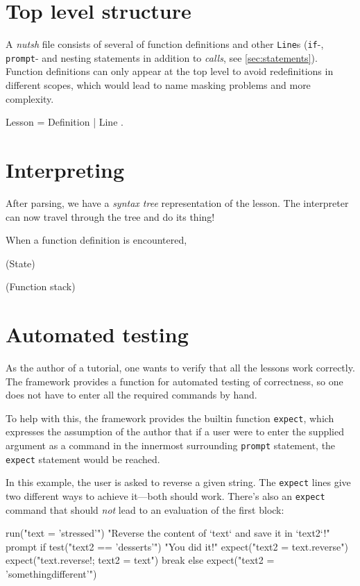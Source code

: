 \documentclass[paper=a4,twoside,abstract=on,cleardoublepage=empty,numbers=noenddot,toc=bib,12pt,appendixprefix=true]{scrreprt}
\begin{document}
\section{Top level structure}

A \emph{nutsh} file consists of several of function definitions and other \texttt{Line}s (\texttt{if}-, \texttt{prompt}- and nesting statements in addition to \emph{calls}, see \cref{sec:statements}). Function definitions can only appear at the top level to avoid redefinitions in different scopes, which would lead to name masking problems and more complexity.

\begin{ebnf}
Lesson = { Definition | Line } .
\end{ebnf}

\section{Interpreting}

After parsing, we have a \emph{syntax tree} representation of the lesson. The interpreter can now travel through the tree and do its thing!

When a function definition is encountered, 

(State)

(Function stack)

\section{Automated testing}

As the author of a tutorial, one wants to verify that all the lessons work correctly. The framework provides a function for automated testing of correctness, so one does not have to enter all the required commands by hand.

To help with this, the framework provides the builtin function \texttt{expect}, which expresses the assumption of the author that if a user were to enter the supplied argument as a command in the innermost surrounding \texttt{prompt} statement, the \texttt{expect} statement would be reached.

In this example, the user is asked to reverse a given string. The \texttt{expect} lines give two different ways to achieve it---both should work. There's also an \texttt{expect} command that should \emph{not} lead to an evaluation of the first block:

\begin{nutsh}
run("text = 'stressed'")
"Reverse the content of `text` and save it in `text2`!"
prompt {
    if test("text2 == 'desserts'") {
        "You did it!"
        expect("text2 = text.reverse")
        expect("text.reverse!; text2 = text")
        break
    } else {
        expect("text2 = 'somethingdifferent'")
    }
}
\end{nutsh}
\end{document}

